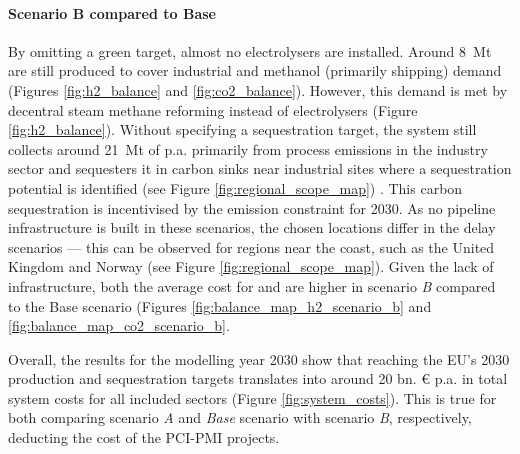 \documentclass[preprint,12pt]{elsarticle}
\begin{document}
\paragraph{Scenario B compared to Base}
By omitting a green  target, almost no electrolysers are installed. Around \SI{8}{Mt} are still produced to cover industrial  and methanol (primarily shipping) demand (Figures \ref{fig:h2_balance} and \ref{fig:co2_balance}). However, this demand is met by decentral steam methane reforming instead of electrolysers (Figure \ref{fig:h2_balance}). 
Without specifying a  sequestration target, the system still collects around \SI{21}{Mt} of  p.a. primarily from process emissions in the industry sector and sequesters it in carbon sinks near industrial sites where a sequestration potential is identified (see Figure \ref{fig:regional_scope_map}) \cite{hofmannH2CO2Network2025}. This carbon sequestration is incentivised by the emission constraint for 2030. As no pipeline infrastructure is built in these scenarios, the chosen locations differ in the delay scenarios --- this can be observed for regions near the coast, such as the United Kingdom and Norway (see Figure \ref{fig:regional_scope_map}). Given the lack of infrastructure, both the average cost for  and  are higher in scenario \textit{B} compared to the Base scenario (Figures \ref{fig:balance_map_h2_scenario_b} and \ref{fig:balance_map_co2_scenario_b}.

Overall, the results for the modelling year 2030 show that reaching the EU's 2030  production and  sequestration targets translates into around 20 bn. \euro{} p.a. in total system costs for all included sectors (Figure \ref{fig:system_costs}). This is true for both comparing scenario \textit{A} and \textit{Base} scenario with scenario \textit{B}, respectively, deducting the cost of the PCI-PMI projects.
\end{document}

